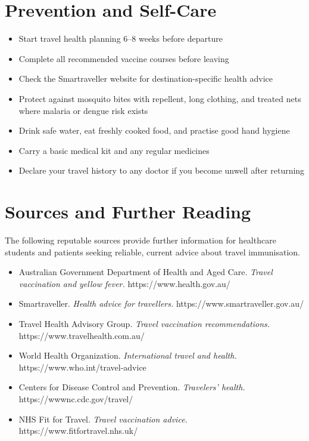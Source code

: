 \section*{Prevention and Self-Care}
\begin{itemize}
    \item Start travel health planning 6--8 weeks before departure
    \item Complete all recommended vaccine courses before leaving
    \item Check the Smartraveller website for destination-specific health advice
    \item Protect against mosquito bites with repellent, long clothing, and treated nets where malaria or dengue risk exists
    \item Drink safe water, eat freshly cooked food, and practise good hand hygiene
    \item Carry a basic medical kit and any regular medicines
    \item Declare your travel history to any doctor if you become unwell after returning
\end{itemize}

\section*{Sources and Further Reading}
The following reputable sources provide further information for healthcare students and patients seeking reliable, current advice about travel immunisation.
\begin{itemize}
    \item Australian Government Department of Health and Aged Care. \textit{Travel vaccination and yellow fever.} https://www.health.gov.au/
    \item Smartraveller. \textit{Health advice for travellers.} https://www.smartraveller.gov.au/
    \item Travel Health Advisory Group. \textit{Travel vaccination recommendations.} https://www.travelhealth.com.au/
    \item World Health Organization. \textit{International travel and health.} https://www.who.int/travel-advice
    \item Centers for Disease Control and Prevention. \textit{Travelers' health.} https://wwwnc.cdc.gov/travel/
    \item NHS Fit for Travel. \textit{Travel vaccination advice.} https://www.fitfortravel.nhs.uk/
\end{itemize}
